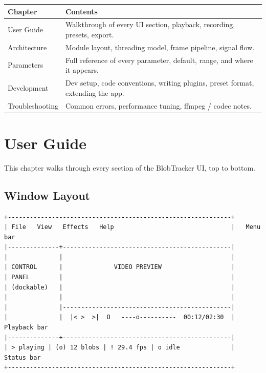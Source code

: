 \documentclass[11pt,a4paper,openany]{report}
\begin{document}
\begin{tabularx}{\linewidth}{@{}lX@{}}
    \toprule
    \textbf{Chapter} & \textbf{Contents} \\
    \midrule
    User Guide       & Walkthrough of every UI section, playback, recording, presets, export. \\
    Architecture     & Module layout, threading model, frame pipeline, signal flow. \\
    Parameters       & Full reference of every parameter, default, range, and where it appears. \\
    Development      & Dev setup, code conventions, writing plugins, preset format, extending the app. \\
    Troubleshooting  & Common errors, performance tuning, ffmpeg / codec notes. \\
    \bottomrule
\end{tabularx}

\chapter{User Guide}

This chapter walks through every section of the BlobTracker UI, top to
bottom.

\section{Window Layout}

\begin{lstlisting}[basicstyle=\ttfamily\footnotesize]
+-------------------------------------------------------------+
| File   View   Effects   Help                                |   Menu bar
|--------------+----------------------------------------------|
|              |                                              |
| CONTROL      |              VIDEO PREVIEW                   |
| PANEL        |                                              |
| (dockable)   |                                              |
|              |                                              |
|              |----------------------------------------------|
|              |  |< >  >|  O   ----o----------  00:12/02:30  |   Playback bar
|--------------+----------------------------------------------|
| > playing | (o) 12 blobs | ! 29.4 fps | o idle              |   Status bar
+-------------------------------------------------------------+
\end{lstlisting}
\end{document}
